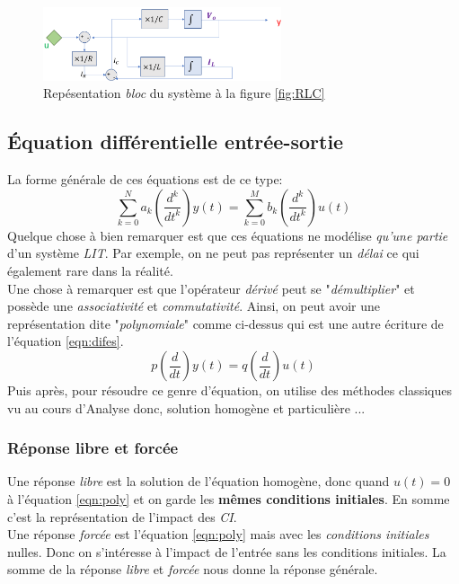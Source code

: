 \documentclass{report}
\begin{document}
\begin{figure}[H] 
\centering
\includegraphics[width=7cm]{img/bloc.png}
\caption{Repésentation \textit{bloc} du système à la figure \ref{fig:RLC}}
\label{fig:bloc}
\end{figure}

\subsection{Équation différentielle entrée-sortie}
La forme générale de ces équations est de ce type:
\begin{equation}\label{eqn:difes}
\sum_{k = 0}^{N} a_k (\frac{d^k}{dt^k}) y(t) = \sum_{k = 0}^M b_k (\frac{d^k}{dt^k}) u(t)
\end{equation}
Quelque chose à bien remarquer est que ces équations ne modélise \textit{qu'une partie} d'un système \textit{LIT}. Par exemple, on ne peut pas représenter un \textit{délai} ce qui également rare dans la réalité.\\

Une chose à remarquer est que l'opérateur \textit{dérivé} peut se "\textit{démultiplier}" et possède une \textit{associativité} et \textit{commutativité}. Ainsi, on peut avoir une représentation dite "\textit{polynomiale}" comme ci-dessus qui est une autre écriture de l'équation \ref{eqn:difes}.
\begin{equation}\label{eqn:poly}
p(\frac{d}{dt})y(t) = q (\frac{d}{dt})u(t)
\end{equation}
Puis après, pour résoudre ce genre d'équation, on utilise des méthodes classiques vu au cours d'Analyse donc, solution homogène et particulière ...

\subsubsection{Réponse libre et forcée}
Une réponse \textit{libre} est la solution de l'équation homogène, donc quand $u(t) = 0$ à l'équation \ref{eqn:poly} et on garde les \textbf{mêmes conditions initiales}. En somme c'est la représentation de l'impact des \textit{CI}.\\

Une réponse \textit{forcée} est l'équation \ref{eqn:poly} mais avec les \textit{conditions initiales} nulles. Donc on s'intéresse à l'impact de l'entrée sans les conditions initiales. La somme de la réponse \textit{libre} et \textit{forcée} nous donne la réponse générale.
\end{document}
